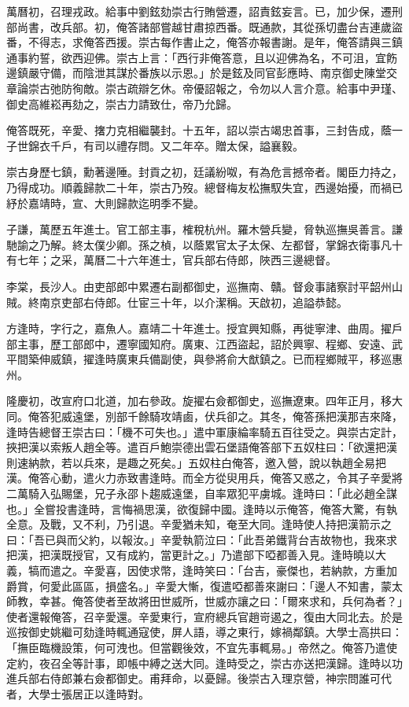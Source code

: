 \begin{pinyinscope}
萬曆初，召理戎政。給事中劉鉉劾崇古行賄營遷，詔責鉉妄言。已，加少保，遷刑部尚書，改兵部。初，俺答諸部嘗越甘肅掠西番。既通款，其從孫切盡台吉連歲盜番，不得志，求俺答西援。崇古每作書止之，俺答亦報書謝。是年，俺答請與三鎮通事約誓，欲西迎佛。崇古上言：「西行非俺答意，且以迎佛為名，不可沮，宜飭邊鎮嚴守備，而陰泄其謀於番族以示恩。」於是鉉及同官彭應時、南京御史陳堂交章論崇古弛防徇敵。崇古疏辯乞休。帝優詔報之，令勿以人言介意。給事中尹瑾、御史高維崧再劾之，崇古力請致仕，帝乃允歸。

俺答既死，辛愛、撦力克相繼襲封。十五年，詔以崇古竭忠首事，三封告成，蔭一子世錦衣千戶，有司以禮存問。又二年卒。贈太保，謚襄毅。

崇古身歷七鎮，勳著邊陲。封貢之初，廷議紛呶，有為危言撼帝者。閣臣力持之，乃得成功。順義歸款二十年，崇古乃歿。總督梅友松撫馭失宜，西邊始擾，而禍已紓於嘉靖時，宣、大則歸款迄明季不變。

子謙，萬歷五年進士。官工部主事，榷稅杭州。羅木營兵變，脅執巡撫吳善言。謙馳諭之乃解。終太僕少卿。孫之楨，以蔭累官太子太保、左都督，掌錦衣衛事凡十有七年；之采，萬曆二十六年進士，官兵部右侍郎，陜西三邊總督。

李棠，長沙人。由吏部郎中累遷右副都御史，巡撫南、贛。督僉事諸察討平韶州山賊。終南京吏部右侍郎。仕宦三十年，以介潔稱。天啟初，追謚恭懿。

方逢時，字行之，嘉魚人。嘉靖二十年進士。授宜興知縣，再徙寧津、曲周。擢戶部主事，歷工部郎中，遷寧國知府。廣東、江西盜起，詔於興寧、程鄉、安遠、武平間築伸威鎮，擢逢時廣東兵備副使，與參將俞大猷鎮之。已而程鄉賊平，移巡惠州。

隆慶初，改宣府口北道，加右參政。旋擢右僉都御史，巡撫遼東。四年正月，移大同。俺答犯威遠堡，別部千餘騎攻靖鹵，伏兵卻之。其冬，俺答孫把漢那吉來降，逢時告總督王崇古曰：「機不可失也。」遣中軍康綸率騎五百往受之。與崇古定計，挾把漢以索叛人趙全等。遣百戶鮑崇德出雲石堡語俺答部下五奴柱曰：「欲還把漢則速納款，若以兵來，是趣之死矣。」五奴柱白俺答，邀入營，說以執趙全易把漢。俺答心動，遣火力赤致書逢時。而全方從臾用兵，俺答又惑之，令其子辛愛將二萬騎入弘賜堡，兄子永邵卜趨威遠堡，自率眾犯平虜城。逢時曰：「此必趙全謀也。」全嘗投書逢時，言悔禍思漢，欲復歸中國。逢時以示俺答，俺答大驚，有執全意。及戰，又不利，乃引退。辛愛猶未知，奄至大同。逢時使人持把漢箭示之曰：「吾已與而父約，以報汝。」辛愛執箭泣曰：「此吾弟鐵背台吉故物也，我來求把漢，把漢既授官，又有成約，當更計之。」乃遣部下啞都善入見。逢時曉以大義，犒而遣之。辛愛喜，因使求幣，逢時笑曰：「台吉，豪傑也，若納款，方重加爵賞，何愛此區區，損盛名。」辛愛大慚，復遣啞都善來謝曰：「邊人不知書，蒙太師教，幸甚。俺答使者至故將田世威所，世威亦讓之曰：「爾來求和，兵何為者？」使者還報俺答，召辛愛還。辛愛東行，宣府總兵官趙岢遏之，復由大同北去。於是巡按御史姚繼可劾逢時輒通寇使，屏人語，導之東行，嫁禍鄰鎮。大學士高拱曰：「撫臣臨機設策，何可洩也。但當觀後效，不宜先事輒易。」帝然之。俺答乃遣使定約，夜召全等計事，即帳中縛之送大同。逢時受之，崇古亦送把漢歸。逢時以功進兵部右侍郎兼右僉都御史。甫拜命，以憂歸。後崇古入理京營，神宗問誰可代者，大學士張居正以逢時對。


\end{pinyinscope}
